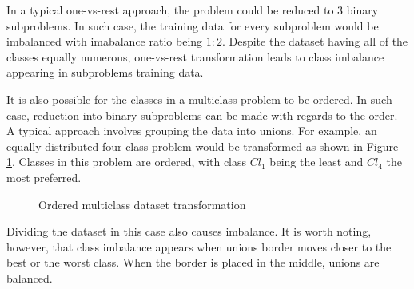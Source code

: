 \documentclass[12pt]{article}
\begin{document}
In a typical one-vs-rest approach, the problem could be reduced to $3$ binary subproblems. In such case, the training data for every subproblem would be imbalanced with imabalance ratio being $1:2$. Despite the dataset having all of the classes equally numerous, one-vs-rest transformation leads to class imbalance appearing in subproblems training data.

It is also possible for the classes in a multiclass problem to be ordered. In such case, reduction into binary subproblems can be made with regards to the order. A typical approach involves grouping the data into unions. For example, an equally distributed four-class problem would be transformed as shown in Figure \ref{img:balanced_ordered}. Classes in this problem are ordered, with class $Cl_1$ being the least and $Cl_4$ the most preferred.

\begin{figure}[H]
\centering
{}



\caption{Ordered multiclass dataset transformation}
\label{img:balanced_ordered}
\end{figure}

Dividing the dataset in this case also causes imbalance. It is worth noting, however, that class imbalance appears when unions border moves closer to the best or the worst class. When the border is placed in the middle, unions are balanced.
\end{document}
